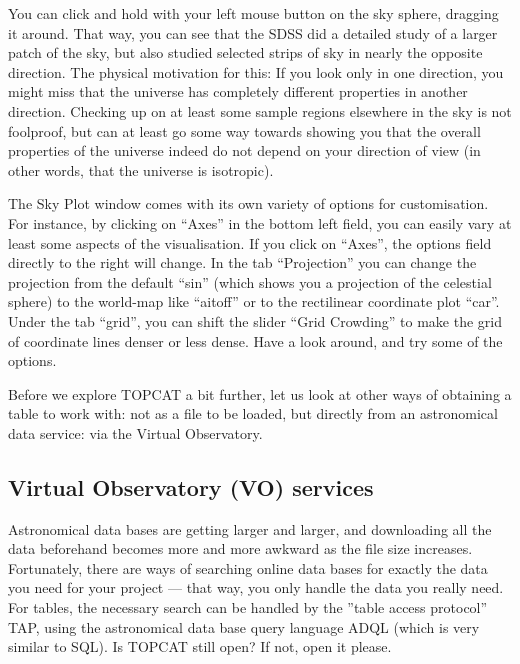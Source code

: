 \documentclass[twocolumn,apj]{openjournal}
\begin{document}
You can click and hold with your left mouse button on the sky sphere, dragging it around. That way, you can see that the SDSS did a detailed study of a larger patch of the sky, but also studied selected strips of sky in nearly the opposite direction. The physical motivation for this: If you look only in one direction, you might miss that the universe has completely different properties in another direction. Checking up on at least some sample regions elsewhere in the sky is not foolproof, but can at least go some way towards showing you that the overall properties of the universe indeed do not depend on your direction of view (in other words, that the universe is isotropic).

The Sky Plot window comes with its own variety of options for customisation. For instance, by clicking on ``Axes'' in the bottom left field, you can easily vary at least some aspects of the visualisation. If you click on ``Axes'', the options field directly to the right will change. In the tab ``Projection'' you can change the projection from the default ``sin'' (which shows you a projection of the celestial sphere) to the world-map like ``aitoff'' or to the rectilinear coordinate plot ``car''. Under the tab ``grid'', you can shift the slider ``Grid Crowding'' to make the grid of coordinate lines denser or less dense. Have a look around, and try some of the options.

Before we explore TOPCAT a bit further, let us look at other ways of obtaining a table to work with: not as a file to be loaded, but directly from an astronomical data service: via the Virtual Observatory.

\subsection{Virtual Observatory (VO) services}
\label{TOPCATVO}

Astronomical data bases are getting larger and larger, and downloading all the data beforehand becomes more and more awkward as the file size increases. Fortunately, there are ways of searching online data bases for exactly the data you need for your project --- that way, you only handle the data you really need. For tables, the necessary search can be handled by the ''table access protocol'' TAP, using the astronomical data base query language ADQL (which is very similar to SQL). Is TOPCAT still open? If not, open it please.
\end{document}
